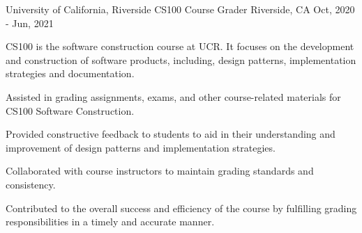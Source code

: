 \cventry
{University of California, Riverside} %
{CS100 Course Grader} %
{Riverside, CA}
{Oct, 2020 - Jun, 2021}
{
	CS100 is the software construction course at UCR. It focuses on the development and construction of software products, including, design patterns, implementation strategies and documentation.
	\begin{cvitemsdesc} %
		\item {Assisted in grading assignments, exams, and other course-related materials for CS100 Software Construction.}
		\item {Provided constructive feedback to students to aid in their understanding and improvement of design patterns and implementation strategies.}
		\item {Collaborated with course instructors to maintain grading standards and consistency.}
		\item {Contributed to the overall success and efficiency of the course by fulfilling grading responsibilities in a timely and accurate manner.}
	\end{cvitemsdesc}
}
